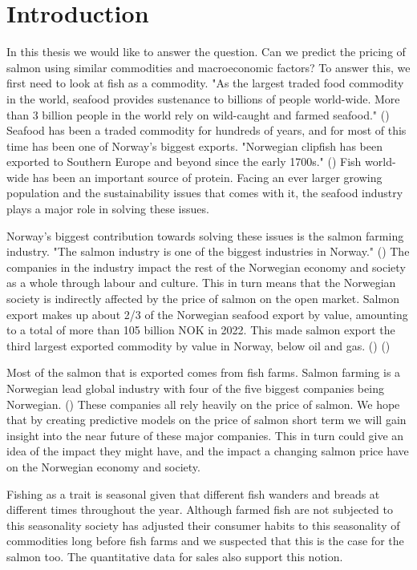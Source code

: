 \section{Introduction}

In this thesis we would like to answer the question. 
Can we predict the pricing of salmon using similar commodities and macroeconomic factors? To answer this, we first need to look at fish as a commodity. "As the largest traded food commodity in the world, seafood provides sustenance to billions of people world-wide. More than 3 billion people in the world rely on wild-caught and farmed seafood." (\cite{wwf_2019}) Seafood has been a traded commodity for hundreds of years, and for most of this time has been one of Norway's biggest exports. "Norwegian clipfish has been exported to Southern Europe and beyond since the early 1700s." (\cite{seafood_from_norway_clipfish}) Fish world-wide has been an important source of protein. Facing an ever larger growing population and the sustainability issues that comes with it, the seafood industry plays a major role in solving these issues.

Norway's biggest contribution towards solving these issues is the salmon farming industry. "The salmon industry is one of the biggest industries in Norway." (\cite{Johansen_et_al_2019}) The companies in the industry impact the rest of the Norwegian economy and society as a whole through labour and culture. This in turn means that the Norwegian society is indirectly affected by the price of salmon on the open market. Salmon export makes up about 2/3 of the Norwegian seafood export by value, amounting to a total of more than 105 billion NOK in 2022. This made salmon export the third largest exported commodity by value in Norway, below oil and gas. (\cite{e24_gasprice_2023}) (\cite{seafood_nokkeltall})

Most of the salmon that is exported comes from fish farms. Salmon farming is a Norwegian lead global industry with four of the five biggest companies being Norwegian. (\cite{ilaks_2020}) These companies all rely heavily on the price of salmon. We hope that by creating predictive models on the price of salmon short term we will gain insight into the near future of these major companies. This in turn could give an idea of the impact they might have, and the impact a changing salmon price have on the Norwegian economy and society.

Fishing as a trait is seasonal given that different fish wanders and breads at different times throughout the year. Although farmed fish are not subjected to this seasonality society has adjusted their consumer habits to this seasonality of commodities long before fish farms and we suspected that this is the case for the salmon too. The quantitative data for sales also support this notion.

